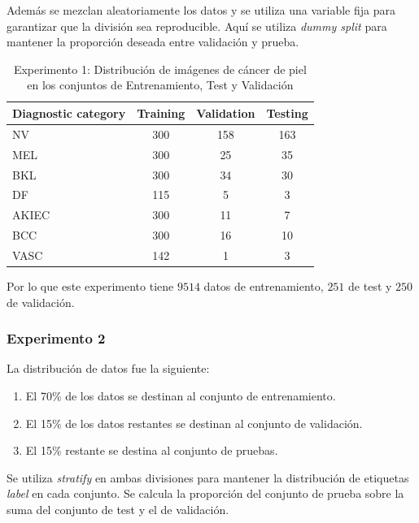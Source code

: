    Además se mezclan aleatoriamente los datos y se utiliza una variable fija para garantizar que la división sea reproducible. Aquí se utiliza \textit{dummy split} para mantener la proporción deseada entre validación y prueba.

   \begin{table}[ht]
      \centering
      \begin{tabular}{lccc}
      \hline
      \textbf{Diagnostic category} & \textbf{Training} & \textbf{Validation} & \textbf{Testing} \\
      \hline
      NV       & 300 & 158 & 163 \\
      MEL      & 300 & 25  & 35  \\
      BKL      & 300 & 34  & 30  \\
      DF       & 115 & 5   & 3   \\
      AKIEC    & 300 & 11  & 7   \\
      BCC      & 300 & 16  & 10  \\
      VASC     & 142 & 1   & 3   \\ \hline
      \end{tabular}
      \caption{Experimento 1: Distribución de imágenes de cáncer de piel en los conjuntos de Entrenamiento, Test y Validación}
      \label{table:train_test_validate_e1}
      \end{table}
   

Por lo que este experimento tiene $9514$ datos de entrenamiento, $251$ de test y $250$ de validación.

\subsubsection{Experimento 2}

La distribución de datos fue la siguiente:

   \begin{enumerate}
      \item El 70\% de los datos se destinan al conjunto de entrenamiento.
      \item El 15\% de los datos restantes se destinan al conjunto de validación.
      \item El 15\% restante se destina al conjunto de pruebas.
   \end{enumerate}
   
Se utiliza \textit{stratify} en ambas divisiones para mantener la distribución de etiquetas \textit{label} en cada conjunto. Se calcula la proporción del conjunto de prueba sobre la suma del conjunto de test y el de validación.

